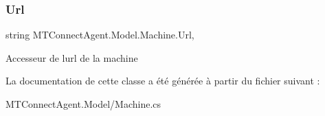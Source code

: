 \subsubsection{\texorpdfstring{Url}{Url}}
{\footnotesize\ttfamily string M\+T\+Connect\+Agent.\+Model.\+Machine.\+Url\hspace{0.3cm}{\ttfamily [get]}, {}}



Accesseur de l\textquotesingle{}url de la machine 



La documentation de cette classe a été générée à partir du fichier suivant \+:\begin{DoxyCompactItemize}
\item 
M\+T\+Connect\+Agent.\+Model/Machine.\+cs\end{DoxyCompactItemize}
